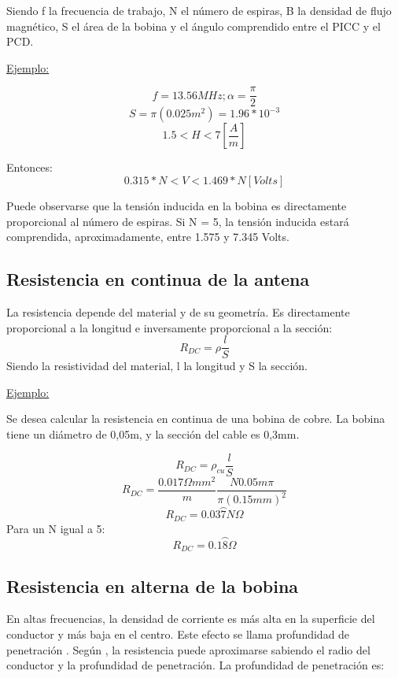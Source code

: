 Siendo f la frecuencia de trabajo, N el número de espiras, B la densidad de flujo magnético, S el área de la bobina y \alpha el ángulo comprendido entre el PICC y el PCD.\newline

\underline {Ejemplo:}\newline

$$f = 13.56 MHz ; \alpha = \frac{\pi}{2}$$
$$S = \pi (0.025m^2) = 1.96*10^{-3}$$
$$1.5 < H < 7 [\frac{A}{m}]$$


Entonces:
$$0.315*N < V < 1.469*N  [Volts]$$

Puede observarse que la tensión inducida en la bobina es directamente proporcional al número de espiras. Si N = 5, la tensión inducida estará comprendida, aproximadamente, entre 1.575 y 7.345 Volts.

\subsection{Resistencia en continua de la antena}
La resistencia depende del material y de su geometría. Es directamente proporcional a la
longitud e inversamente proporcional a la sección:
\begin{equation}
\boxed{R_{DC} = \rho \frac{l}{S}}
\end{equation}
Siendo \rho la resistividad del material, l la longitud y S la sección.\newline

\underline {Ejemplo:}\newline

Se desea calcular la resistencia en continua de una bobina de cobre. La bobina tiene un
diámetro de 0,05m, y la sección del cable es 0,3mm.

$$ R_{DC} = \rho _{cu}\frac{l}{S} $$
$$ R_{DC} = \frac{0.017 \Omega mm^2}{m}\frac{N 0.05m \pi}{\pi (0.15mm)^2} $$
$$ R_{DC} = 0.03\wideparen{7} N \Omega $$
Para un N igual a 5:
$$ R_{DC} = 0.1\wideparen{8} \Omega $$

\subsection{Resistencia en alterna de la bobina}
En altas frecuencias, la densidad de corriente es más alta en la superficie del conductor y
más baja en el centro. Este efecto se llama profundidad de penetración \delta.
Según  \cite{antena_AN710}, la resistencia puede aproximarse sabiendo el radio del conductor y la profundidad de penetración.
La profundidad de penetración es:

